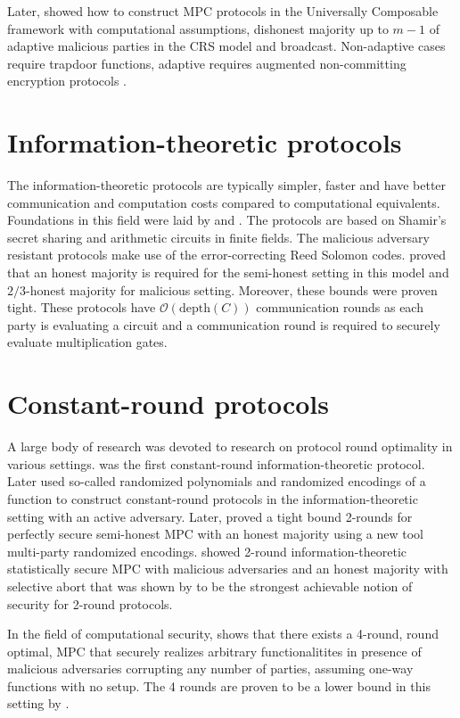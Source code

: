 \documentclass[
  digital, %
  twoside, %
  table,   %
  lof,     %
  lot,     %
]{fithesis3}
\newcommand{\bigO}[0]{\mathcal{O}}
\theoremstyle{definition}
\theoremstyle{remark}
\begin{document}
Later, \cite{CLOS02} showed how to construct MPC protocols in the Universally Composable framework with computational assumptions, dishonest majority up to $m-1$ of adaptive malicious parties in the CRS model and broadcast. 
Non-adaptive cases require trapdoor functions, adaptive requires augmented non-committing encryption protocols \cite{CFGN96}.

\section{Information-theoretic protocols}\label{sec:soa:infproto}%
The information-theoretic protocols are typically simpler, faster and have better communication and computation costs compared to computational equivalents. Foundations in this field were laid by \cite{BGW88} and \cite{CCD88}. The protocols are based on Shamir's secret sharing and arithmetic circuits in finite fields. The malicious adversary resistant protocols make use of the error-correcting Reed Solomon codes. \cite{BGW88} proved that an honest majority is required for the semi-honest setting in this model and $2/3$-honest majority for malicious setting. Moreover, these bounds were proven tight. These protocols have $\bigO(\text{depth}(C))$ communication rounds as each party is evaluating a circuit and a communication round is required to securely evaluate multiplication gates.

\section{Constant-round protocols}\label{sec:soa:const_rounds}%
A large body of research was devoted to research on protocol round optimality in various settings. \cite{BB89} was the first constant-round information-theoretic protocol. Later \cite{IK00, IK02} used so-called randomized polynomials and randomized encodings \cite{AIK04} of a function to construct constant-round protocols in the information-theoretic setting with an active adversary. Later, \cite{ABT18} proved a tight bound 2-rounds for perfectly secure semi-honest MPC with an honest majority using a new tool multi-party randomized encodings. \cite{cryptoeprint:2018:1078} showed 2-round information-theoretic statistically secure MPC with malicious adversaries and an honest majority with selective abort that was shown by \cite{GIKR04} to be the strongest achievable notion of security for 2-round protocols.

In the field of computational security, \cite{cryptoeprint:2017:1056} shows that there exists a 4-round, round optimal, MPC that securely realizes arbitrary functionalitites in presence of malicious adversaries corrupting any number of parties, assuming one-way functions with no setup. The 4 rounds are proven to be a lower bound in this setting by \cite{cryptoeprint:2016:252}.
\end{document}
